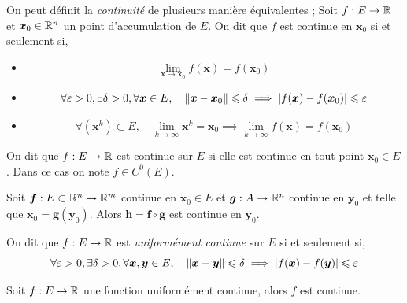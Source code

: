 \begin{definition} \label{def: Caractérisation de la continuité}
On peut définit la \emph{continuité} de plusieurs manière équivalentes ; Soit $f : E \to \mathbb{R}$ et $\bm x_0 \in \mathbb{R}^n$ un point d'accumulation de $E$. On dit que $f$ est continue en $\bm x_0$ si et seulement si,
	\begin{itemize}
		\item \[
		\lim_{\bm x \to \bm x_0} f(\bm x) = f(\bm x_0)
		\]
		\item \[
		\forall \varepsilon > 0, \exists \delta > 0, \forall \bm x \in E, \quad \| \bm x- \bm x_0 \| \leqslant \delta \implies |f(\bm x) - f(\bm x_0)| \leqslant \varepsilon
		\]
		\item 
		\[
		\forall (\bm x^k) \subset E, \quad \lim_{k \to \infty} \bm x^k = \bm x_0 \implies \lim_{k \to \infty} f(\bm x) = f(\bm x_0)
		\]
	\end{itemize}
	On dit que $f : E \to \mathbb{R}$ est continue sur $E$ si elle est continue en tout point $\bm x_0 \in E$. Dans ce cas on note $f \in C^0(E)$.
\end{definition}

\begin{theorem} \label{thm: Composition de fonctions continues}
	Soit $\bm f : E \subset \mathbb{R}^n \to \mathbb{R}^m$ continue en $\bm x_0 \in E$ et $\bm g : A \to \mathbb{R}^n$ continue en $\bm y_0$ et telle que $\bm x_0 = \bm g(\bm y_0)$. Alors $\bm h = \bm f \circ \bm g$ est continue en $\bm y_0$.
\end{theorem}


\begin{definition} \label{def: Uniforme continuité}
	On dit que $f : E \to \mathbb{R}$ est \emph{uniformément continue} sur $E$ si et seulement si,
	\[
	\forall \varepsilon > 0, \exists \delta > 0, \forall \bm x, \bm y \in E, \quad \| \bm x -\bm y \| \leqslant \delta \implies |f(\bm x) - f(\bm y)| \leqslant \varepsilon 
	\]
\end{definition}

\begin{proposition} 
	Soit $f : E \to \mathbb{R}$ une fonction uniformément continue, alors $f$ est continue.
\end{proposition}


